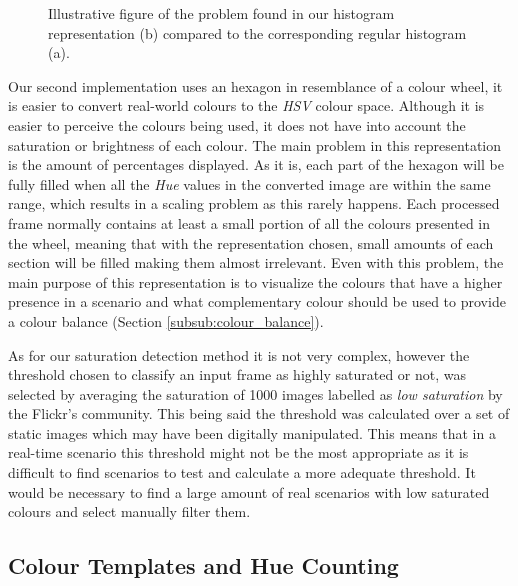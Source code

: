 \begin{figure}[htb]
	\centering
  	\caption{Illustrative figure of the problem found in our histogram representation (b) compared to the corresponding regular histogram (a).}
	\label{fig:disc_hist}
\end{figure}

Our second implementation uses an hexagon in resemblance of a colour wheel, it is easier to convert real-world colours to the \emph{HSV} colour space. Although it is easier to perceive the colours being used, it does not have into account the saturation or brightness of each colour. 
The main problem in this representation is the amount of percentages displayed. As it is, each part of the hexagon will be fully filled when all the \emph{Hue} values in the converted image are within the same range, which results in a scaling problem as this rarely happens. Each processed frame normally contains at least a small portion of all the colours presented in the wheel, meaning that with the representation chosen, small amounts of each section will be filled making them almost irrelevant. Even with this problem, the main purpose of this representation is to visualize the colours that have a higher presence in a scenario and what complementary colour should be used to provide a colour balance (Section \ref{subsub:colour_balance}).


As for our saturation detection method it is not very complex, however the threshold chosen to classify an input frame as highly saturated or not, was selected by averaging the saturation of 1000 images labelled as \emph{low saturation} by the Flickr's community. This being said the threshold was calculated over a set of static images which may have been digitally manipulated. This means that in a real-time scenario this threshold might not be the most appropriate as it is difficult to find scenarios to test and calculate a more adequate threshold. It would be necessary to find a large amount of real scenarios with low saturated colours and select manually filter them.

\subsection{Colour Templates and Hue Counting}
\label{sub:colour}

